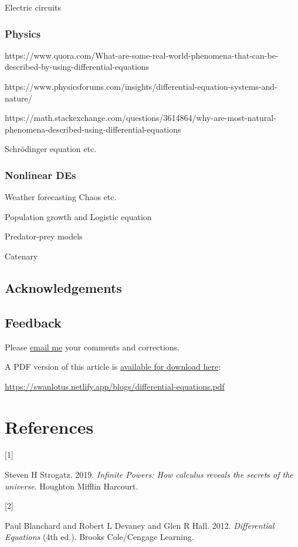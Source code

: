 \documentclass[
  a4paper,
]{article}
\newlength{\cslhangindent}
\newlength{\csllabelwidth}
\newenvironment{CSLReferences}[2] %
 {\begin{list}{}{%
  \setlength{\itemindent}{0pt}
  \setlength{\leftmargin}{0pt}
  \setlength{\parsep}{0pt}
  \ifodd #1
   \setlength{\leftmargin}{\cslhangindent}
   \setlength{\itemindent}{-1\cslhangindent}
  \fi
  \setlength{\itemsep}{#2\baselineskip}}}
 {\end{list}}
\newcommand{\CSLLeftMargin}[1]{\parbox[t]{\csllabelwidth}{\strut#1\strut}}
\newcommand{\CSLRightInline}[1]{\parbox[t]{\linewidth - \csllabelwidth}{\strut#1\strut}}
\begin{document}
Electric circuits

\subsubsection{Physics}\label{physics}

https://www.quora.com/What-are-some-real-world-phenomena-that-can-be-described-by-using-differential-equations

https://www.physicsforums.com/insights/differential-equation-systems-and-nature/

https://math.stackexchange.com/questions/3614864/why-are-most-natural-phenomena-described-using-differential-equations

Schrödinger equation etc.

\subsubsection{Nonlinear DEs}\label{nonlinear-des}

Weather forecasting Chaos etc.

Population growth and Logistic equation

Predator-prey models

Catenary

\subsection{Acknowledgements}\label{acknowledgements}

\subsection{Feedback}\label{feedback}

Please \href{mailto:feedback.swanlotus@gmail.com}{email me} your
comments and corrections.

\noindent A PDF version of this article is
\href{./differetial-equations.pdf}{available for download here}:

\begin{sffamily}

\url{https://swanlotus.netlify.app/blogs/differential-equations.pdf}

\end{sffamily}

\section*{References}\label{bibliography}

\label{refs}
\begin{CSLReferences}{0}{0}
\CSLLeftMargin{{[}1{]} }%
\CSLRightInline{Steven H Strogatz. 2019. \emph{{Infinite Powers}: {How
calculus reveals the secrets of the universe}}. Houghton Mifflin
Harcourt.}

\CSLLeftMargin{{[}2{]} }%
\CSLRightInline{Paul Blanchard and Robert L Devaney and Glen R Hall.
2012. \emph{{Differential Equations}} (4th ed.). Brooks Cole/Cengage
Learning.}

\end{CSLReferences}
\end{document}
